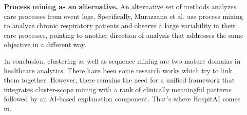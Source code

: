 \textbf{Process mining as an alternative.} An alternative set of methods analyzes care processes from event logs. Specifically, Murazzano et al. \cite{murazzano2026} use process mining to analyze chronic respiratory patients and observe a large variability in their care processes, pointing to another direction of analysis that addresses the same objective in a different way.

In conclusion, clustering as well as sequence mining are two mature domains in healthcare analytics. There have been some research works which try to link them together. However, there remains the need for a unified framework that integrates cluster-scope mining with a rank of clinically meaningful patterns followed by an AI-based explanation component. That's where HospitAI comes in.